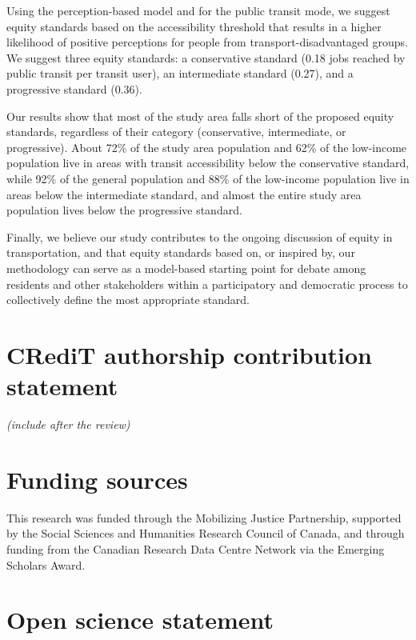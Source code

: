 \documentclass[preprint, 3p,
authoryear]{elsarticle} %
\begin{document}
Using the perception-based model and for the public transit mode, we
suggest equity standards based on the accessibility threshold that
results in a higher likelihood of positive perceptions for people from
transport-disadvantaged groups. We suggest three equity standards: a
conservative standard (0.18 jobs reached by public transit per transit
user), an intermediate standard (0.27), and a progressive standard
(0.36).

Our results show that most of the study area falls short of the proposed
equity standards, regardless of their category (conservative,
intermediate, or progressive). About 72\% of the study area population
and 62\% of the low-income population live in areas with transit
accessibility below the conservative standard, while 92\% of the general
population and 88\% of the low-income population live in areas below the
intermediate standard, and almost the entire study area population lives
below the progressive standard.

Finally, we believe our study contributes to the ongoing discussion of
equity in transportation, and that equity standards based on, or
inspired by, our methodology can serve as a model-based starting point
for debate among residents and other stakeholders within a participatory
and democratic process to collectively define the most appropriate
standard.

\section*{CRediT authorship contribution
statement}\label{credit-authorship-contribution-statement}

\emph{(include after the review)}

\section*{Funding sources}\label{funding-sources}

This research was funded through the Mobilizing Justice Partnership,
supported by the Social Sciences and Humanities Research Council of
Canada, and through funding from the Canadian Research Data Centre
Network via the Emerging Scholars Award.

\section*{Open science statement}\label{open-science-statement}
\end{document}

